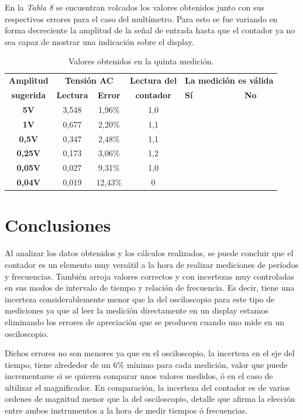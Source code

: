 \documentclass{article}
\newcommand{\tick}{\ding{52}}
\begin{document}
	En la \textit{Tabla 8} se encuentran volcados los valores obtenidos junto con sus respectivos errores para el caso del multímetro. Para esto se fue variando en forma decreciente la amplitud de la señal de entrada hasta que el contador ya no sea capaz de mostrar una indicación sobre el display.
\bigskip

	
\begin{table}[!hbt]
	\begin{center}

		\begin{tabular}{|c|c|c|c|>{\centering}p{1.65cm}|c|} \hline
			\textbf{Amplitud} & \multicolumn{2}{c|}{\textbf{Tensión AC}} & \textbf{Lectura del} & \multicolumn{2}{c|}{\textbf{La medición es válida}} \\\cline{2-3}\cline{5-6}
			\textbf{sugerida} & \textbf{Lectura} & \textbf{Error} & \textbf{contador} & \textbf{Sí} & \textbf{No} \\\hline
			
			\textbf{5V} & 3,548 & 1,96\% & 1,0 & \tick &  \\\hline
			\textbf{1V} & 0,677 & 2,20\% & 1,1 & \tick &  \\\hline
			\textbf{0,5V} & 0,347 & 2,48\% & 1,1 & \tick &  \\\hline
			\textbf{0,25V} & 0,173 & 3,06\% & 1,2 & \tick &  \\\hline
			\textbf{0,05V} & 0,027 & 9,31\% & 1,0 & \tick &  \\\hline
			\textbf{0,04V} & 0,019 & 12,43\% & 0 &  & \tick \\\hline

		\end{tabular}

	\caption{Valores obtenidos en la quinta medición.}
	\end{center}
\end{table}
\medskip


\section{Conclusiones}

	
	Al analizar los datos obtenidos y los cálculos realizados, se puede concluir que el contador es un elemento muy versátil a la hora de realizar mediciones de períodos y frecuencias. También arroja valores correctos y con incertezas muy controladas en sus modos de intervalo de tiempo y relación de frecuencia. Es decir, tiene una incerteza considerablemente menor que la del osciloscopio para este tipo de mediciones ya que al leer la medición directamente en un display estamos eliminando los errores de apreciación que se producen cuando uno mide en un osciloscopio.
	\par
	Dichos errores no son menores ya que en el osciloscopio, la incerteza en el eje del tiempo, tiene alrededor de un 6\% mínimo para cada medición, valor que puede incrementarse si se quieren comparar unos valores medidos, ó en el caso de ultilizar el magnificador. En comparación, la incerteza del contador es de varios ordenes de magnitud menor que la del osciloscopio, detalle que afirma la elección entre ambos instrumentos a la hora de medir tiempos ó frecuencias.
\end{document}
